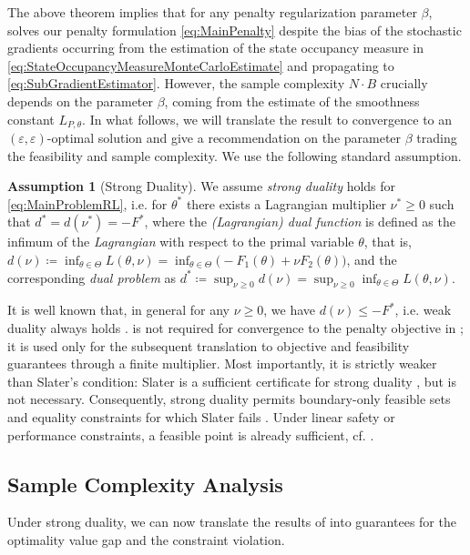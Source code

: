 \documentclass{article}
\theoremstyle{plain}
\theoremstyle{definition}
\newtheorem{assumption}[theorem]{Assumption}
\theoremstyle{remark}
\def\epsilon{{\varepsilon}}
\newcommand{\define}{\coloneqq}
\def\xx{{\theta}}
\def\xxOpt{\xx^{*}}
\def\nuOpt{{\nu^{*}}}
\def\XX{{\Theta}}
\def\Fopt{{F^*}}
\def\dOpt{{d^*}}
\begin{document}
The above theorem implies that for any penalty regularization parameter
$\beta$,  solves our penalty formulation
\eqref{eq:MainPenalty} despite the bias of the stochastic gradients
occurring from the estimation of the state occupancy measure in
\eqref{eq:StateOccupancyMeasureMonteCarloEstimate} and propagating to
\eqref{eq:SubGradientEstimator}. However, the sample complexity $N \cdot B$
crucially depends on the parameter $\beta$, coming from the estimate of the
smoothness constant $L_{P,\theta}.$ In what follows, we will translate the
result to convergence to an $(\epsilon, \epsilon)$-optimal solution and
give a recommendation on the parameter $\beta$ trading the feasibility and
sample complexity. We use the following standard assumption.

\begin{assumption}[Strong Duality]
 \label{ass:StrongDuality}
 We assume \emph{strong duality} holds for \eqref{eq:MainProblemRL},
 i.e. for $\xxOpt$ there exists a Lagrangian multiplier
 $\nuOpt \geq 0$ such that $\dOpt = d(\nuOpt) = -\Fopt$, where
 the \emph{(Lagrangian) dual function} is defined as
 the infimum of the \emph{Lagrangian} with respect to the primal variable $\xx$, that is,
 $d(\nu)\define\inf_{\xx\in\XX}L(\xx,\nu)
  =\inf_{\xx\in\XX}\bigl(-F_1(\xx)+\nu F_2(\xx)\bigr)$,
 and the corresponding \emph{dual problem} as
 $\dOpt \define \sup_{\nu \geq 0} d(\nu)
  = \sup_{\nu \geq 0} \inf_{\xx \in \XX} L(\xx, \nu)$.
\end{assumption}
It is well known that,
in general for any $\nu \geq 0$, we have $d(\nu) \leq -\Fopt$, i.e. weak
duality always holds \cite{nesterovLecturesConvexOptimization2018}.
 is not required for convergence to the penalty
objective in ; it is used only for the subsequent
translation to objective and feasibility guarantees through a finite
multiplier. Most importantly, it is strictly weaker than Slater's condition: Slater is a
sufficient certificate for strong duality
\citep{nesterovLecturesConvexOptimization2018}, but is not necessary.
Consequently, strong duality permits boundary-only feasible sets and
equality constraints for which Slater fails
\cite{fatkhullinGlobalSolutionsNonConvex2025}. Under linear
safety or performance constraints, a feasible point is already sufficient, cf.
\citet[Prop. 5.3.1]{bertsekasConvexOptimizationTheory2009}.



\subsection{Sample Complexity Analysis}
\label{sec:ComplexityAnalysis}
Under strong duality, we can now translate the results of
 into guarantees for the optimality value gap
and the constraint violation.
\end{document}
